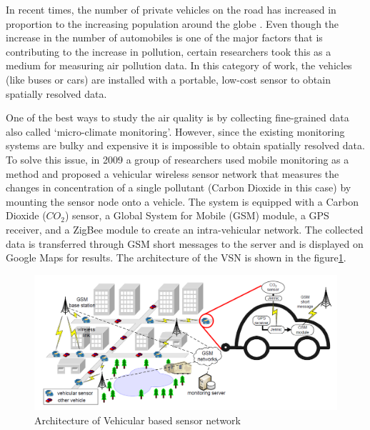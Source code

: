 In recent times, the number of private vehicles on the road has increased in proportion to the increasing population around the globe \cite{Downs2004}. Even though the increase in the number of automobiles is one of the major factors that is contributing to the increase in pollution, certain researchers took this as a medium for measuring air pollution data. In this category of work, the vehicles (like buses or cars) are installed with a portable, low-cost sensor to obtain spatially resolved data. 
\par
 One of the best ways to study the air quality is by collecting fine-grained data also called \lq{micro-climate monitoring}\rq. However, since the existing monitoring systems are bulky and expensive it is impossible to obtain spatially resolved data. To solve this issue, in 2009 a group of researchers used mobile monitoring as a method and proposed a vehicular wireless sensor network \cite{Hu2009} that measures the changes in concentration of a single pollutant (Carbon Dioxide in this case) by mounting the sensor node onto a vehicle. The system is equipped with a Carbon Dioxide ($CO_2$) sensor, a Global System for Mobile (GSM) module, a GPS receiver, and a ZigBee module to create an intra-vehicular network. The collected data is transferred through GSM short messages to the server and is displayed on Google Maps for results. The architecture of the VSN is shown in the figure\ref{vsn}. 

 \begin{figure}[h!]
  \begin{center}
  \includegraphics[scale=0.65]{./images/figure40.png}
  \end{center}
 
  \caption{Architecture of Vehicular based sensor network \cite{Hu2009}}
  
  \label{vsn}
\end{figure}
 

